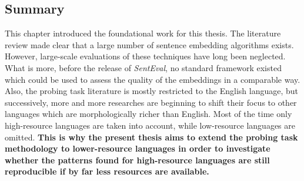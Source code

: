 \subsection{Summary}
\label{sec:rel_work_summary}

This chapter introduced the foundational work for this thesis. The literature review made clear that a large number of sentence embedding algorithms exists. However, large-scale evaluations of these techniques have long been neglected. What is more, before the release of \textit{SentEval}, no standard framework existed which could be used to assess the quality of the embeddings in a comparable way. Also, the probing task literature is mostly restricted to the English language, but successively, more and more researches are beginning to shift their focus to other languages which are morphologically richer than English. Most of the time only high-resource languages are taken into account, while low-resource languages are omitted. \textbf{This is why the present thesis aims to extend the probing task methodology to lower-resource languages in order to investigate whether the patterns found for high-resource languages are still reproducible if by far less resources are available.}
